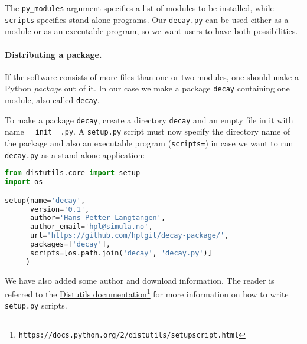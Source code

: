 \documentclass[graybox,sectrefs,envcountresetchap,open=right,final]{svmonodo}
\begin{document}
The \Verb!py_modules! argument specifies a list of modules to be installed, while
\texttt{scripts} specifies stand-alone programs. Our \texttt{decay.py} can be used
either as a module or as an executable program, so we want users to
have both possibilities.

\paragraph{Distributing a package.}
If the software consists of more files than one or two modules, one
should make a Python \emph{package} out of it. In our case we make a
package \texttt{decay} containing one module, also called \texttt{decay}.

To make a package \texttt{decay}, create a directory \texttt{decay} and an empty
file in it with name \Verb!__init__.py!.
A \texttt{setup.py} script must now specify the directory name of the package
and also an executable program (\texttt{scripts=})
in case we want to run \texttt{decay.py} as a stand-alone application:













\begin{lstlisting}[language=python,style=blue1bar_bluegreen]
from distutils.core import setup
import os

setup(name='decay',
      version='0.1',
      author='Hans Petter Langtangen',
      author_email='hpl@simula.no',
      url='https://github.com/hplgit/decay-package/',
      packages=['decay'],
      scripts=[os.path.join('decay', 'decay.py')]
     )

\end{lstlisting}

We have also added some author and download information.
The reader is referred to the \href{{https://docs.python.org/2/distutils/setupscript.html}}{Distutils documentation}\footnote{\texttt{https://docs.python.org/2/distutils/setupscript.html}} for more information on how to
write \texttt{setup.py} scripts.

\end{document}
